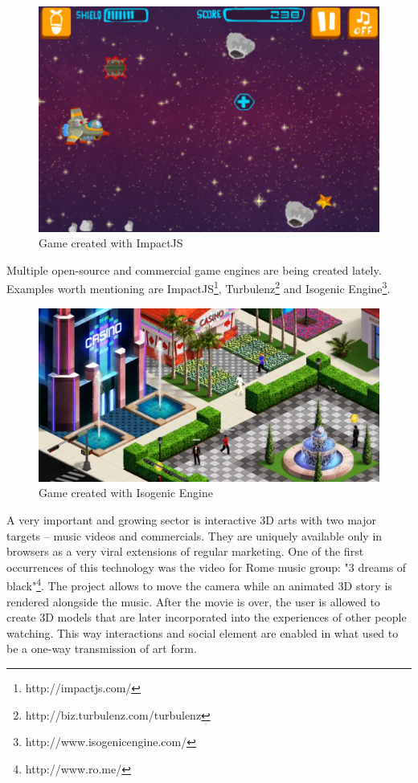 \begin{figure}[h!]
  \caption{Game created with ImpactJS}
  \label{img:impactjs}
  \centering
	\includegraphics[width=12cm]{summary/impactjs.png}
\end{figure}

Multiple open-source and commercial game engines are being created lately. Examples worth mentioning are ImpactJS\footnote{http://impactjs.com/}, Turbulenz\footnote{http://biz.turbulenz.com/turbulenz} and Isogenic Engine\footnote{http://www.isogenicengine.com/}.


\begin{figure}[h!]
  \caption{Game created with Isogenic Engine}
  \label{img:isogenic}
  \centering
	\includegraphics[width=12cm]{summary/isogenic.png}
\end{figure}

A very important and growing sector is interactive 3D arts with two major targets -- music videos and commercials. They are uniquely available only in browsers as a very viral extensions of regular marketing. One of the first occurrences of this technology was the video for Rome music group: "3 dreams of black"\footnote{http://www.ro.me/}. The project allows to move the camera while an animated 3D story is rendered alongside the music. After the movie is over, the user is allowed to create 3D models that are later incorporated into the experiences of other people watching. This way interactions and social element are enabled in what used to be a one-way transmission of art form.

